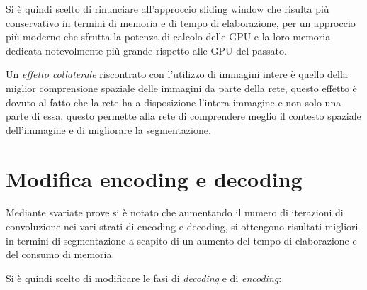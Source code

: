 Si è quindi scelto di rinunciare all'approccio sliding window che risulta più conservativo in termini di memoria e di tempo di elaborazione, per un approccio più moderno che sfrutta la potenza di calcolo delle GPU e la loro memoria dedicata notevolmente più grande rispetto alle GPU del passato.

Un \textit{effetto collaterale} riscontrato con l'utilizzo di immagini intere è quello della miglior comprensione spaziale delle immagini da parte della rete, questo effetto è dovuto al fatto che la rete ha a disposizione l'intera immagine e non solo una parte di essa, questo permette alla rete di comprendere meglio il contesto spaziale dell'immagine e di migliorare la segmentazione.



\section{Modifica encoding e decoding} %
\label{sub:Modifica encoding e decoding}
Mediante svariate prove si è notato che aumentando il numero di iterazioni di convoluzione nei vari strati di encoding e decoding, si ottengono risultati migliori in termini di segmentazione a scapito di un aumento del tempo di elaborazione e del consumo di memoria.

Si è quindi scelto di modificare le fasi di \textit{decoding} e di \textit{encoding}:


